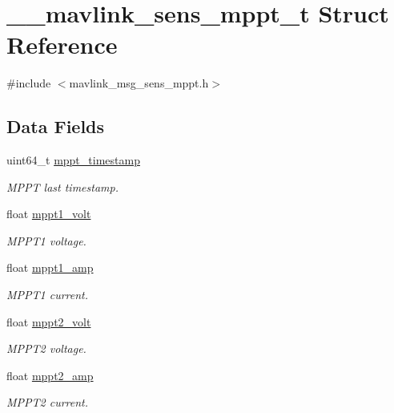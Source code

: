 \hypertarget{struct____mavlink__sens__mppt__t}{\section{\+\_\+\+\_\+mavlink\+\_\+sens\+\_\+mppt\+\_\+t Struct Reference}
\label{struct____mavlink__sens__mppt__t}
}


{\ttfamily \#include $<$mavlink\+\_\+msg\+\_\+sens\+\_\+mppt.\+h$>$}

\subsection*{Data Fields}
\begin{DoxyCompactItemize}
\item 
uint64\+\_\+t \hyperlink{struct____mavlink__sens__mppt__t_a884b19c39378d9c856c8b16af1fb3088}{mppt\+\_\+timestamp}
\begin{DoxyCompactList}\small\item\em M\+P\+P\+T last timestamp. \end{DoxyCompactList}\item 
float \hyperlink{struct____mavlink__sens__mppt__t_aadf7a31f9fd7f3a38c469e026b5f291f}{mppt1\+\_\+volt}
\begin{DoxyCompactList}\small\item\em M\+P\+P\+T1 voltage. \end{DoxyCompactList}\item 
float \hyperlink{struct____mavlink__sens__mppt__t_a9305702e73df94fb3c123e94941f0765}{mppt1\+\_\+amp}
\begin{DoxyCompactList}\small\item\em M\+P\+P\+T1 current. \end{DoxyCompactList}\item 
float \hyperlink{struct____mavlink__sens__mppt__t_a50784947a7583543614537c0a32ee00f}{mppt2\+\_\+volt}
\begin{DoxyCompactList}\small\item\em M\+P\+P\+T2 voltage. \end{DoxyCompactList}\item 
float \hyperlink{struct____mavlink__sens__mppt__t_a833709d26d8b3f6c44c474db42231d32}{mppt2\+\_\+amp}
\begin{DoxyCompactList}\small\item\em M\+P\+P\+T2 current. \end{DoxyCompactList}\item 

\end{DoxyCompactItemize}
